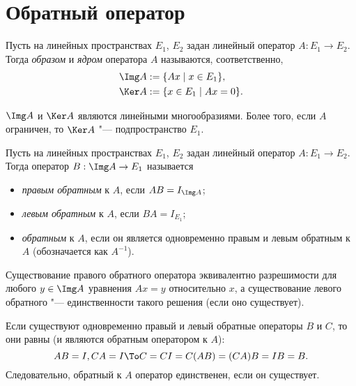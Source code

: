 \documentclass[main]{subfiles}
\begin{document}
\section{Обратный оператор}

\begin{definition}
  Пусть на линейных пространствах \( E_1 \), \( E_2 \)
  задан линейный оператор \( A : E_1 \to E_2 \).
  Тогда \emph{образом} и \emph{ядром} оператора \( A \)
  называются, соответственно,
  \begin{align}
    &\Img A := \{ A x \mid x \in E_1 \}, \\
    &\Ker A := \{ x \in E_1 \mid A x = 0 \}.
  \end{align}
\end{definition}

\begin{remark}
  \( \Img A \) и \( \Ker A \)
  являются линейными многообразиями.
  Более того, если \( A \) ограничен, то
  \( \Ker A \) "--- подпространство \( E_1 \).
\end{remark}

\begin{definition}
  Пусть на линейных пространствах \( E_1 \), \( E_2 \)
  задан линейный оператор \( A : E_1 \to E_2 \).
  Тогда оператор \( B : \Img A \to E_1 \) называется
  \begin{itemize}
    \item \emph{правым обратным} к \( A \),
      если \( AB = I_{\Img A} \);
    \item \emph{левым обратным} к \( A \),
      если \( BA = I_{E_1} \);
    \item \emph{обратным} к \( A \),
      если он является одновременно правым и левым обратным
      к \( A \) (обозначается как \( A^{-1} \)).
  \end{itemize}
\end{definition}

\begin{remark}
  Существование правого обратного оператора эквивалентно
  разрешимости для любого \( y \in \Img A \)
  уравнения \( A x = y \) относительно \( x \),
  а существование левого обратного "---
  единственности такого решения (если оно существует).
\end{remark}

\begin{remark}
  Если существуют одновременно
  правый и левый обратные операторы
  \( B \) и \( C \),
  то они равны
  (и являются обратным оператором к \( A \)):
  \[
    AB = I, CA = I \To
    C = C I = C (AB) = (CA) B = I B = B.
  \]
  Следовательно, обратный к \( A \) оператор
  единственен, если он существует.
\end{remark}
\end{document}
